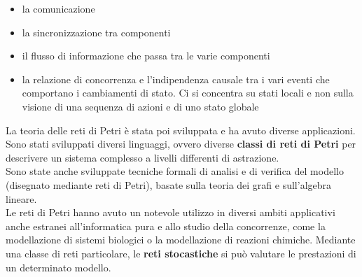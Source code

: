 \documentclass[a4paper,12pt, oneside]{book}
\begin{document}
\begin{itemize}
\begin{itemize}
    \item la comunicazione
    \item la sincronizzazione tra componenti
    \item il flusso di informazione che passa tra le varie componenti
    \item la relazione di concorrenza e l'indipendenza causale tra i vari eventi
    che comportano i cambiamenti di stato. Ci si concentra su stati locali
    e non sulla visione di una sequenza di azioni e di uno stato globale
  \end{itemize}
  La teoria delle reti di Petri è stata poi sviluppata e ha avuto diverse
  applicazioni. Sono stati sviluppati diversi linguaggi, ovvero diverse
  \textbf{classi di reti di Petri} per descrivere un sistema complesso a livelli
  differenti di astrazione. \\
  Sono state anche sviluppate tecniche formali di analisi e di verifica del
  modello (disegnato mediante reti di Petri), basate sulla teoria dei grafi e
  sull'algebra lineare.\\
  Le reti di Petri hanno avuto un notevole utilizzo in diversi ambiti
  applicativi anche estranei all'informatica pura e allo studio della
  concorrenze, come la modellazione di sistemi biologici o la modellazione di
  reazioni chimiche. Mediante una classe di reti particolare, le \textbf{reti
    stocastiche} si può valutare le prestazioni di un determinato modello.
\end{itemize}
\end{document}
